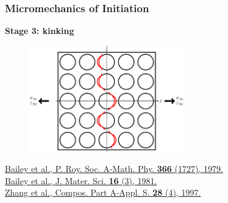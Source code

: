 \documentclass[first,firstsupp,lastsupp,last,hyperref,table]{ETHclass}
\begin{document}
\begin{frame}
\frametitle{\vspace{0.2cm}\small Micromechanics of Initiation}
\vspace{-0.5cm}
\centering
\begin{alertblock}{\centering\scriptsize\bf Stage 3: kinking}
\vspace{-0.25cm}
\begin{figure}
\centering
\includegraphics[width=0.6\textwidth]{stage3-kinking.pdf}
\end{figure}
\end{alertblock}
\vspace{-0.5cm}
\centering
\pgfmathsetmacro{}
\pgfmathsetmacro{}
{\centering\fontsize{\fontsizeref}{\stretchref} \selectfont \href{https://doi.org/10.1098/rspa.1979.0071}{Bailey et al., P. Roy. Soc. A-Math. Phy. \textbf{366} (1727), 1979.}}\\\vspace{-5pt}
{\centering\fontsize{\fontsizeref}{\stretchref} \selectfont \href{https://doi.org/10.1007/BF00552203}{Bailey et al., J. Mater. Sci. \textbf{16} (3), 1981.}}\\\vspace{-5pt}
{\centering\fontsize{\fontsizeref}{\stretchref} \selectfont \href{https://doi.org/10.1016/S1359-835X(96)00123-6}{Zhang et al., Compos. Part A-Appl. S. \textbf{28} (4), 1997.}}\\\vspace{1pt}
\end{frame}

\addtocounter{framenumber}{-1}
\end{document}
